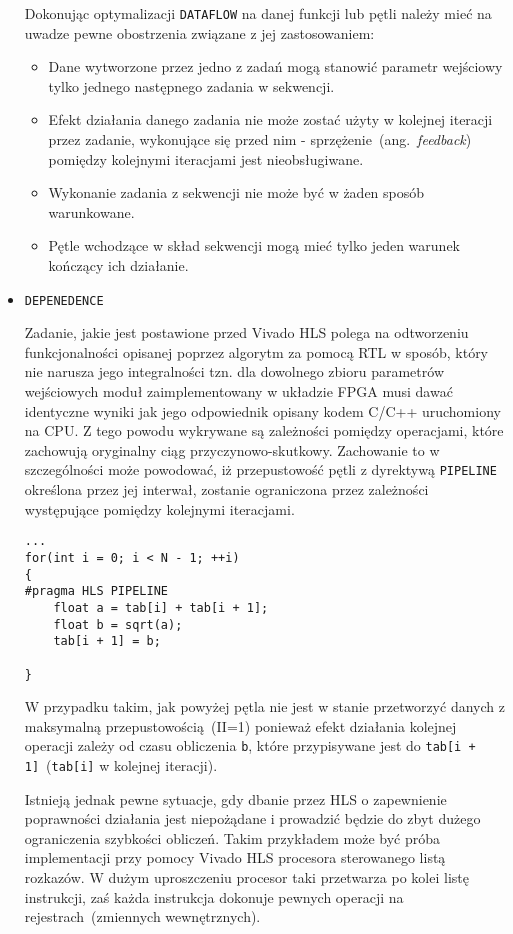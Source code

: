 \begin{itemize}
Dokonując optymalizacji \texttt{DATAFLOW} na danej funkcji lub pętli należy mieć na uwadze pewne obostrzenia związane z jej zastosowaniem:
\begin{itemize}
\item Dane wytworzone przez jedno z zadań mogą stanowić parametr wejściowy tylko jednego następnego zadania w sekwencji.
\item Efekt działania danego zadania nie może zostać użyty w kolejnej iteracji przez zadanie, wykonujące się przed nim - sprzężenie~(ang.~\textit{feedback}) pomiędzy kolejnymi iteracjami jest nieobsługiwane. 
\item Wykonanie zadania z sekwencji nie może być w żaden sposób warunkowane.
\item Pętle wchodzące w skład sekwencji mogą mieć tylko jeden warunek kończący ich działanie.
\end{itemize}

\item \texttt{DEPENEDENCE}

Zadanie, jakie jest postawione przed Vivado HLS polega na odtworzeniu funkcjonalności opisanej poprzez algorytm za pomocą RTL w sposób, który nie narusza jego integralności tzn. dla dowolnego zbioru parametrów wejściowych moduł zaimplementowany w układzie FPGA musi dawać identyczne wyniki jak jego odpowiednik opisany kodem C/C++ uruchomiony na CPU. Z tego powodu wykrywane są zależności pomiędzy operacjami, które zachowują oryginalny ciąg przyczynowo-skutkowy. Zachowanie to w szczególności może powodować, iż przepustowość pętli z dyrektywą \texttt{PIPELINE} określona przez jej interwał, zostanie ograniczona przez zależności występujące pomiędzy kolejnymi iteracjami.

\begin{lstlisting}[caption=Zależność interwału pętli od występujących zależności pomiędzy kolejnymi iteracjami]
...
for(int i = 0; i < N - 1; ++i)
{
#pragma HLS PIPELINE
	float a = tab[i] + tab[i + 1];
	float b = sqrt(a);
	tab[i + 1] = b;
	
}
\end{lstlisting}
W przypadku takim, jak powyżej pętla nie jest w stanie przetworzyć danych z maksymalną przepustowością~(II=1) ponieważ efekt działania kolejnej operacji zależy od czasu obliczenia \texttt{b}, które przypisywane jest do \texttt{tab[i + 1]}~(\texttt{tab[i]} w kolejnej iteracji). 

Istnieją jednak pewne sytuacje, gdy dbanie przez HLS o zapewnienie poprawności działania jest niepożądane i prowadzić będzie do zbyt dużego ograniczenia szybkości obliczeń. Takim przykładem może być próba implementacji przy pomocy Vivado HLS procesora sterowanego listą rozkazów. W dużym uproszczeniu procesor taki przetwarza po kolei listę instrukcji, zaś każda instrukcja dokonuje pewnych operacji na rejestrach~(zmiennych wewnętrznych). 


\end{itemize}
